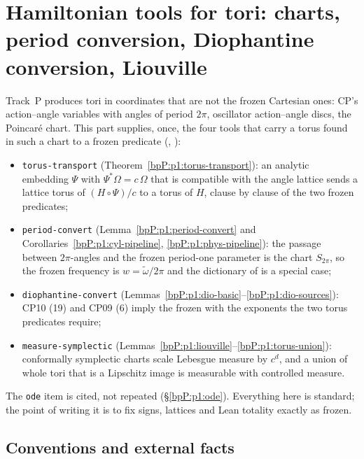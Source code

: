 \section{Hamiltonian tools for tori: charts, period conversion, Diophantine conversion, Liouville}\label{bpP:p1}
\begingroup\sloppy

Track~P produces tori in coordinates that are not the frozen Cartesian ones: CP's action--angle variables with angles of
period $2\pi$, oscillator action--angle discs, the Poincar\'e chart. This part supplies, once, the four tools that carry a
torus found in such a chart to a frozen predicate (, ):
\begin{itemize}
\item \texttt{torus-transport} (Theorem~\ref{bpP:p1:torus-transport}): an analytic embedding $\Psi$ with $\Psi^*\Omega=c\,\Omega$ that is compatible with the angle lattice sends a lattice torus of $(H\circ\Psi)/c$ to a torus of $H$, clause by clause of the two frozen predicates;
\item \texttt{period-convert} (Lemma~\ref{bpP:p1:period-convert} and Corollaries~\ref{bpP:p1:cyl-pipeline}, \ref{bpP:p1:phys-pipeline}): the passage between $2\pi$-angles and the frozen period-one parameter is the chart $S_{2\pi}$, so the frozen frequency is $w=\tilde\omega/2\pi$ and the dictionary of  is a special case;
\item \texttt{diophantine-convert} (Lemmas~\ref{bpP:p1:dio-basic}--\ref{bpP:p1:dio-sources}): CP10 (19) and CP09 (6) imply the frozen  with the exponents the two torus predicates require;
\item \texttt{measure-symplectic} (Lemmas~\ref{bpP:p1:liouville}--\ref{bpP:p1:torus-union}): conformally symplectic charts scale Lebesgue measure by $c^d$, and a union of whole tori that is a Lipschitz image is measurable with controlled measure.
\end{itemize}
The \texttt{ode} item is cited, not repeated (\S\ref{bpP:p1:ode}). Everything here is standard; the point of writing it is to fix signs, lattices and Lean totality exactly as frozen.

\subsection{Conventions and external facts}\label{bpP:p1:conv}

